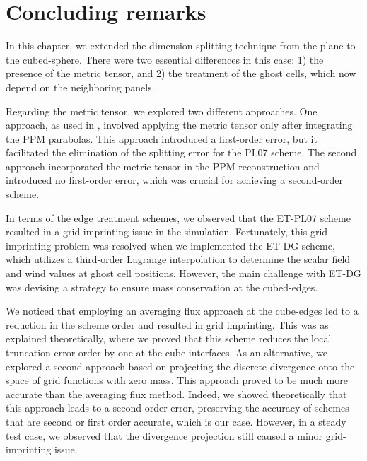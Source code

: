 \section{Concluding remarks}
\label{chp-cs-conc}
In this chapter, we extended the dimension splitting technique from the plane to the 
cubed-sphere. There were two essential differences in this case: 1) the presence of the 
metric tensor, and 2) the treatment of the ghost cells, which now depend on the neighboring 
panels.

Regarding the metric tensor, we explored two different approaches. One approach, as used in 
\citet{putman:2007}, involved applying the metric tensor only after integrating the PPM parabolas. 
This approach introduced a first-order error, but it facilitated the elimination of the 
splitting error for the PL07 scheme. The second approach incorporated the metric tensor in 
the PPM reconstruction and introduced no first-order error, which was crucial for achieving 
a second-order scheme.

In terms of the edge treatment schemes, we observed that the ET-PL07 scheme resulted in a 
grid-imprinting issue in the simulation. Fortunately, this grid-imprinting problem was 
resolved when we implemented the ET-DG scheme, which utilizes a third-order Lagrange 
interpolation to determine the scalar field and wind values at ghost cell positions. 
However, the main challenge with ET-DG was devising a strategy to ensure mass 
conservation at the cubed-edges.

We noticed that employing an averaging flux approach at the cube-edges led to a reduction 
in the scheme order and resulted in grid imprinting. This was as explained theoretically, where
we proved that this scheme reduces the local truncation error order by one at the cube interfaces.
As an alternative, we explored a second approach based on projecting the discrete divergence onto the space of grid 
functions with zero mass. This approach proved to be much more accurate than the averaging 
flux method.  Indeed, we showed theoretically that this approach leads to a second-order error, preserving the
accuracy of schemes that are second or first order accurate, which is our case.
However, in a steady test case, we observed that the divergence projection still caused a 
minor grid-imprinting issue.
\iffalse
\fi